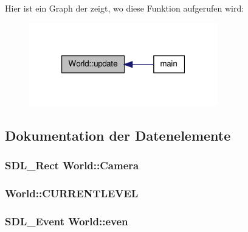 Hier ist ein Graph der zeigt, wo diese Funktion aufgerufen wird\-:\nopagebreak
\begin{figure}[H]
\begin{center}
\leavevmode
\includegraphics[width=232pt]{class_world_aac8c1fde63c06577ffc648aaefdb37f0_icgraph}
\end{center}
\end{figure}




\subsection{Dokumentation der Datenelemente}
\hypertarget{class_world_a47489c465efb92fb238c0ebc05a56c15}{
\subsubsection[{Camera}]{\setlength{\rightskip}{0pt plus 5cm}S\-D\-L\-\_\-\-Rect World\-::\-Camera\hspace{0.3cm}{\ttfamily [private]}}}\label{class_world_a47489c465efb92fb238c0ebc05a56c15}
\hypertarget{class_world_ae8611da95b21e3f88a929a71a848c46a}{
\subsubsection[{C\-U\-R\-R\-E\-N\-T\-L\-E\-V\-E\-L}]{ World\-::\-C\-U\-R\-R\-E\-N\-T\-L\-E\-V\-E\-L\hspace{0.3cm}{\ttfamily [private]}}}\label{class_world_ae8611da95b21e3f88a929a71a848c46a}
\hypertarget{class_world_a4f32e82a26dac5cc9ce72bfe0d596340}{
\subsubsection[{even}]{\setlength{\rightskip}{0pt plus 5cm}S\-D\-L\-\_\-\-Event World\-::even\hspace{0.3cm}{\ttfamily [private]}}}\label{class_world_a4f32e82a26dac5cc9ce72bfe0d596340}
